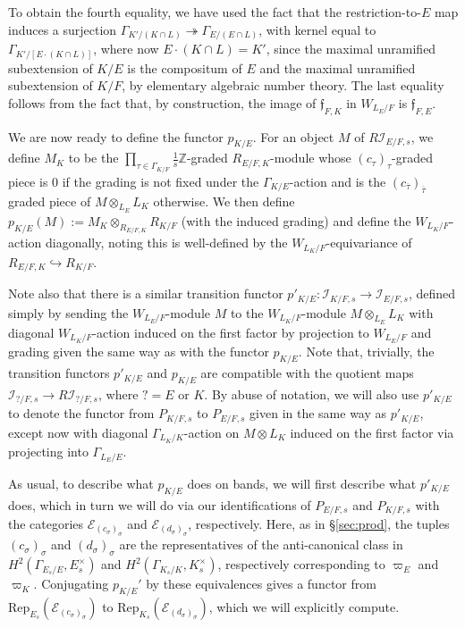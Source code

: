 \documentclass[11pt]{amsart}
\theoremstyle{definition}
\newcommand{\mc}{\mathcal}
\newcommand{\Z}{\mathbb{Z}}
\newcommand{\ov}{\overline}
\newcommand{\mf}{\mathfrak}
\begin{document}
To obtain the fourth equality, we have used the fact that the restriction-to-$E$ map induces a surjection $\Gamma_{K'/(K \cap L)} \twoheadrightarrow \Gamma_{E/(E \cap L)}$, with kernel equal to $\Gamma_{K'/[E \cdot (K \cap L)]}$, where now $E \cdot (K \cap L) = K'$, since the maximal unramified subextension of $K/E$ is the compositum of $E$ and the maximal unramified subextension of $K/F$, by elementary algebraic number theory. The last equality follows from the fact that, by construction, the image of $\mf{f}_{F,K}$ in $W_{L_{E}/F}$ is $\mf{f}_{F,E}$.

We are now ready to define the functor $p_{K/E}$. For an object $M$ of $R\mc{I}_{E/F, s}$, we define $M_K$ to be the $\prod\limits_{\tau \in \Gamma_{K/F}} \frac{1}{s} \Z$-graded $R_{E/F, K}$-module whose $(c_{\tau})_{\tau}$-graded piece is $0$ if the grading is not fixed under the $\Gamma_{K/E}$-action and is the $(c_{\ov{\tau}})_{\ov{\tau}}$ graded piece of $M \otimes_{L_{E}} L_K$ otherwise. We then define $p_{K/E}(M) := M_K \otimes_{R_{E/F, K}} R_{K/F}$ (with the induced grading) and define the $W_{L_K/F}$-action diagonally, noting this is well-defined by the $W_{L_K/F}$-equivariance of $R_{E/F, K} \hookrightarrow R_{K/F}$.

Note also that there is a similar transition functor $p'_{K/E} \colon \mc{I}_{K/F,s} \to \mc{I}_{E/F,s}$, defined simply by sending the $W_{L_{E}/F}$-module $M$ to the $W_{L_{K}/F}$-module $M \otimes_{L_{E}} L_{K}$ with diagonal $W_{L_{K}/F}$-action induced on the first factor by projection to $W_{L_{E}/F}$ and grading given the same way as with the functor $p_{K/E}$. Note that, trivially, the transition functors $p'_{K/E}$ and $p_{K/E}$ are compatible with the quotient maps $\mc{I}_{?/F,s} \to R\mc{I}_{?/F,s}$, where $?=E$ or $K$. By abuse of notation, we will also use $p'_{K/E}$ to denote the functor from $P_{K/F,s}$ to $P_{E/F,s}$ given in the same way as $p'_{K/E}$, except now with diagonal $\Gamma_{L_{K}/K}$-action on $M \otimes L_{K}$ induced on the first factor via projecting into $\Gamma_{L_{E}/E}$. 

As usual, to describe what $p_{K/E}$ does on bands, we will first describe what $p'_{K/E}$ does, which in turn we will do via our identifications of $P_{E/F,s}$ and $P_{K/F,s}$ with the categories $\mc{E}_{(c_{\sigma})_{\sigma}}$ and $\mc{E}_{(d_{\sigma})_{\sigma}}$, respectively. Here, as in \S \ref{sec:prod}, the tuples $(c_{\sigma})_{\sigma}$ and $(d_{\sigma})_{\sigma}$ are the representatives of the anti-canonical class in $H^{2}(\Gamma_{E_{s}/E}, E_{s}^{\times})$ and $H^{2}(\Gamma_{K_{s}/K}, K_{s}^{\times})$, respectively corresponding to $\varpi_{E}$ and $\varpi_{K}$. Conjugating $p_{K/E}'$ by these equivalences gives a functor from $\text{Rep}_{E_{s}}(\mc{E}_{(c_{\sigma})_{\sigma}})$ to $\text{Rep}_{K_{s}}(\mc{E}_{(d_{\sigma})_{\sigma}})$, which we will explicitly compute. 
\end{document}
